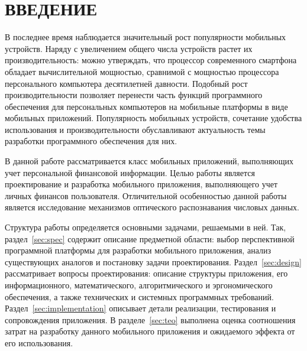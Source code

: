 \section*{ВВЕДЕНИЕ}

В последнее время наблюдается значительный рост
популярности мобильных устройств.
Наряду с увеличением общего числа устройств растет их производительность:
можно утверждать, что процессор современного смартфона обладает
вычислительной мощностью, сравнимой с мощностью процессора
персонального компьютера десятилетней давности.
Подобный рост производительности позволяет перенести часть функций
программного обеспечения для персональных компьютеров
на мобильные платформы в виде мобильных приложений.
Популярность мобильных устройств,
сочетание удобства использования и производительности
обуславливают актуальность темы разработки программного
обеспечения для них.

В данной работе рассматривается класс мобильных приложений,
выполняющих учет персональной финансовой информации.
Целью работы является проектирование и разработка мобильного приложения,
выполняющего учет личных финансов пользователя.
Отличительной особенностью данной работы является исследование
механизмов оптического распознавания числовых данных.

Структура работы определяется основными задачами, решаемыми в ней.
Так, раздел~\ref{sec:spec} содержит описание предметной области:
выбор перспективной программной платформы для разработки мобильного
приложения, анализ существующих аналогов и постановку задачи проектирования.
Раздел~\ref{sec:design} рассматривает вопросы проектирования:
описание структуры приложения, его информационного, математического,
алгоритмического и эргономического обеспечения,
а также технических и системных программных требований.
Раздел~\ref{sec:implementation} описывает детали реализации,
тестирования и сопровождения приложения.
В разделе~\ref{sec:teo} выполнена оценка соотношения затрат
на разработку данного мобильного приложения и ожидаемого эффекта
от его использования.
